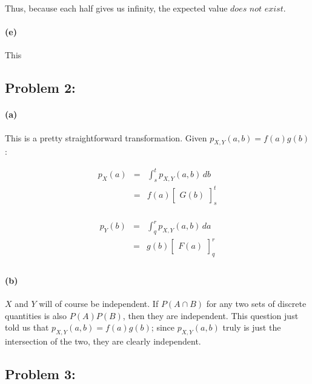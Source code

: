 \documentclass[a4paper]{article}
\begin{document}
Thus, because each half gives us infinity, the expected value $\textit{does not exist}$.

\paragraph{(e)} This 

\subsection*{Problem 2:}

\paragraph{(a)} This is a pretty straightforward transformation. Given $p_{X, Y}(a, b) = f(a)g(b)$:

\begin{equation}
\begin{array}{rcc}
p_{X}(a) & = & \displaystyle\int^{t}_{s} p_{X, Y}(a, b) \,db \\[.15in]
& = & f(a) \begin{bmatrix} G(b) \end{bmatrix}^{t}_{s}\\[.15in]
\end{array}
\end{equation}

\begin{equation}
\begin{array}{rcc}
p_{Y}(b) & = & \displaystyle\int^{r}_{q} p_{X, Y}(a, b) \,da \\[.15in]
& = & g(b) \begin{bmatrix} F(a) \end{bmatrix}^{r}_{q}\\[.15in]
\end{array}
\end{equation}

\paragraph{(b)} $X$ and $Y$ will of course be independent. If $P(A \cap B)$ for any two sets of discrete quantities is also $P(A)P(B)$, then they are independent. This question just told us that $p_{X, Y}(a,b) = f(a)g(b)$; since $p_{X, Y}(a, b)$ truly is just the intersection of the two, they are clearly independent.

\subsection*{Problem 3:}
\end{document}
